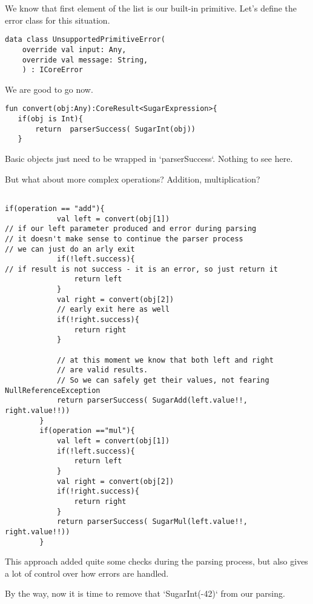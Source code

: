 \documentclass[11pt]{article}
\begin{document}
We know that first element of the list is our built-in primitive. Let's define the error class for this situation.

\begin{verbatim}
data class UnsupportedPrimitiveError(
    override val input: Any,
    override val message: String,
    ) : ICoreError

\end{verbatim}

We are good to go now.

\begin{verbatim}
fun convert(obj:Any):CoreResult<SugarExpression>{
   if(obj is Int){
       return  parserSuccess( SugarInt(obj))
   }
\end{verbatim}

Basic objects just need to be wrapped in `parserSuccess`. Nothing to see here.

But what about more complex operations? Addition, multiplication?

\begin{verbatim}

if(operation == "add"){
            val left = convert(obj[1])
// if our left parameter produced and error during parsing
// it doesn't make sense to continue the parser process
// we can just do an arly exit
            if(!left.success){
// if result is not success - it is an error, so just return it
                return left
            }
            val right = convert(obj[2])
            // early exit here as well
            if(!right.success){
                return right
            }

            // at this moment we know that both left and right
            // are valid results.
            // So we can safely get their values, not fearing NullReferenceException
            return parserSuccess( SugarAdd(left.value!!, right.value!!))
        }
        if(operation =="mul"){
            val left = convert(obj[1])
            if(!left.success){
                return left
            }
            val right = convert(obj[2])
            if(!right.success){
                return right
            }
            return parserSuccess( SugarMul(left.value!!, right.value!!))
        }
\end{verbatim}

This approach added quite some checks during the parsing process, but also gives a lot of control over how errors are handled.

By the way, now it is time to remove that `SugarInt(-42)` from our parsing.
\end{document}

